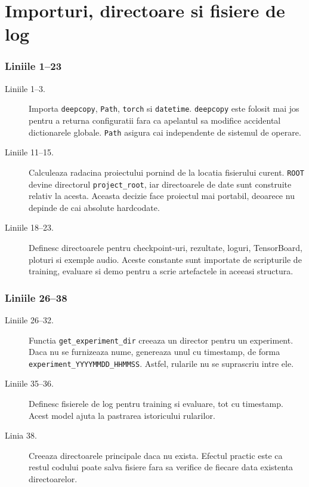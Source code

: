 \documentclass[12pt,a4paper]{report}
\newcommand{\codechunk}[2]{%
\subsection*{Liniile #1--#2}

}
\begin{document}
\chapter{Importuri, directoare si fisiere de log}

\codechunk{1}{23}

\begin{description}
    \item[Liniile 1--3.] Importa \texttt{deepcopy}, \texttt{Path}, \texttt{torch}
    si \texttt{datetime}. \texttt{deepcopy} este folosit mai jos pentru a returna
    configuratii fara ca apelantul sa modifice accidental dictionarele globale.
    \texttt{Path} asigura cai independente de sistemul de operare.

    \item[Liniile 11--15.] Calculeaza radacina proiectului pornind de la locatia
    fisierului curent. \texttt{ROOT} devine directorul \texttt{project\_root}, iar
    directoarele de date sunt construite relativ la acesta. Aceasta decizie face
    proiectul mai portabil, deoarece nu depinde de cai absolute hardcodate.

    \item[Liniile 18--23.] Definesc directoarele pentru checkpoint-uri, rezultate,
    loguri, TensorBoard, ploturi si exemple audio. Aceste constante sunt importate
    de scripturile de training, evaluare si demo pentru a scrie artefactele in
    aceeasi structura.
\end{description}

\codechunk{26}{38}

\begin{description}
    \item[Liniile 26--32.] Functia \texttt{get\_experiment\_dir} creeaza un director
    pentru un experiment. Daca nu se furnizeaza nume, genereaza unul cu timestamp,
    de forma \texttt{experiment\_YYYYMMDD\_HHMMSS}. Astfel, rularile nu se suprascriu
    intre ele.

    \item[Liniile 35--36.] Definesc fisierele de log pentru training si evaluare,
    tot cu timestamp. Acest model ajuta la pastrarea istoricului rularilor.

    \item[Linia 38.] Creeaza directoarele principale daca nu exista. Efectul practic
    este ca restul codului poate salva fisiere fara sa verifice de fiecare data
    existenta directoarelor.
\end{description}
\end{document}
